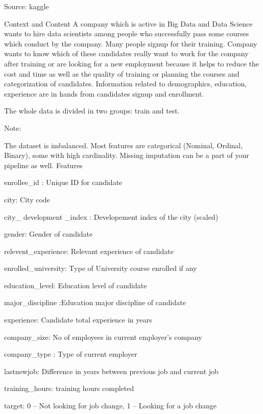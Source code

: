 Source: kaggle

Context and Content
A company which is active in Big Data and Data Science wants to hire data scientists among people who successfully pass some courses which conduct by the company. Many people signup for their training. Company wants to know which of these candidates really want to work for the company after training or are looking for a new employment because it helps to reduce the cost and time as well as the quality of training or planning the courses and categorization of candidates. Information related to demographics, education, experience are in hands from candidates signup and enrollment.

The whole data is divided in two groups: train and test. 

Note:

The dataset is imbalanced.
Most features are categorical (Nominal, Ordinal, Binary), some with high cardinality.
Missing imputation can be a part of your pipeline as well.
Features

enrollee_id : Unique ID for candidate

city: City code

city_ development _index : Developement index of the city (scaled)

gender: Gender of candidate

relevent_experience: Relevant experience of candidate

enrolled_university: Type of University course enrolled if any

education_level: Education level of candidate

major_discipline :Education major discipline of candidate

experience: Candidate total experience in years

company_size: No of employees in current employer's company

company_type : Type of current employer

lastnewjob: Difference in years between previous job and current job

training_hours: training hours completed

target: 0 – Not looking for job change, 1 – Looking for a job change
